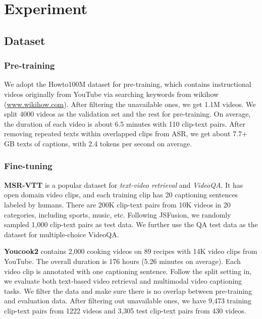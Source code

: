 \documentclass[11pt,a4paper]{article}
\begin{document}
\section{Experiment}
\label{sec:exp}
\subsection{Dataset}

\subsubsection{Pre-training}
We adopt the Howto100M dataset \cite{miech2019howto100m} for pre-training, which contains instructional videos originally from YouTube via searching keywords from wikihow (\url{www.wikihow.com}). 
After filtering the unavailable ones, we get 1.1M videos. We split 4000 videos as the validation set and the rest for pre-training.
On average, the duration of each video is about 6.5 minutes with 110 clip-text pairs.
After removing repeated texts within overlapped clips from ASR, we get about 7.7+ GB texts of captions, with 2.4 tokens per second on average.


\subsubsection{Fine-tuning}
\noindent \textbf{MSR-VTT} \cite{xu2016msr} is a popular dataset for \textit{text-video retrieval} and \textit{VideoQA}.
It has open domain video clips, and each training clip has 20 captioning sentences labeled by humans. 
There are 200K clip-text pairs from 10K videos in 20 categories, including sports, music, etc.
Following JSFusion\cite{yu2018joint,miech2019howto100m}, we randomly sampled 1,000 clip-text pairs as test data.
We further use the QA test data \cite{yu2018joint} as the dataset for multiple-choice VideoQA.

\noindent \textbf{Youcook2} \cite{zhou2017towards} contains 2,000 cooking videos on 89 recipes with 14K video clips from YouTube. 
The overall duration is 176 hours (5.26 minutes on average). 
Each video clip is annotated with one captioning sentence. 
Follow the split setting in\cite{miech2019howto100m}, we evaluate both text-based video retrieval and multimodal video captioning tasks. 
We filter the data and make sure there is no overlap between pre-training and evaluation data. 
After filtering out unavailable ones, we have 9,473 training clip-text pairs from 1222 videos and 3,305 test clip-text pairs from 430 videos.
\end{document}
